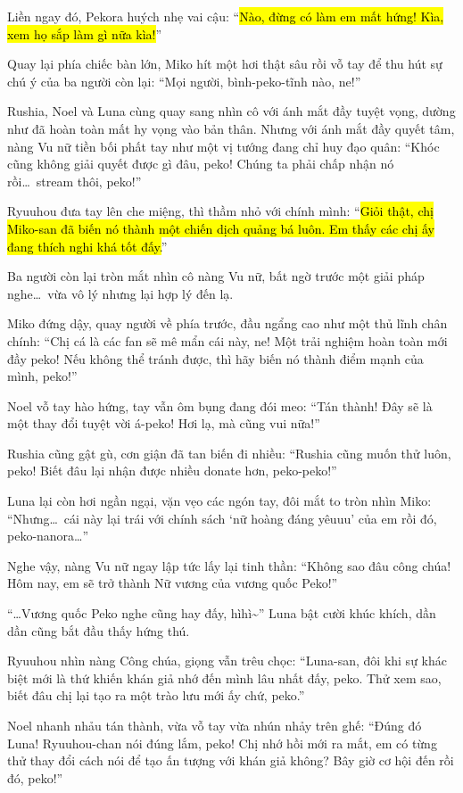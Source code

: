 \documentclass[../main.tex]{subfiles}
\begin{document}
Liền ngay đó, Pekora huých nhẹ vai cậu: ``\hl{Nào, đừng có làm em mất hứng! Kìa, xem họ sắp làm gì nữa kìa!}''

Quay lại phía chiếc bàn lớn, Miko hít một hơi thật sâu rồi vỗ tay để thu hút sự chú ý của ba người còn lại: ``Mọi người, bình-peko-tĩnh nào, ne!''

Rushia, Noel và Luna cùng quay sang nhìn cô với ánh mắt đầy tuyệt vọng, dường như đã hoàn toàn mất hy vọng vào bản thân. Nhưng với ánh mắt đầy quyết tâm, nàng Vu nữ tiền bối phất tay như một vị tướng đang chỉ huy đạo quân: ``Khóc cũng không giải quyết được gì đâu, peko! Chúng ta phải chấp nhận nó rồi\dots\ stream thôi, peko!''

Ryuuhou đưa tay lên che miệng, thì thầm nhỏ với chính mình: ``\hl{Giỏi thật, chị Miko-san đã biến nó thành một chiến dịch quảng bá luôn. Em thấy các chị ấy đang thích nghi khá tốt đấy.}''

Ba người còn lại tròn mắt nhìn cô nàng Vu nữ, bất ngờ trước một giải pháp nghe\dots\ vừa vô lý nhưng lại hợp lý đến lạ.

Miko đứng dậy, quay người về phía trước, đầu ngẩng cao như một thủ lĩnh chân chính: ``Chị cá là các fan sẽ mê mẩn cái này, ne! Một trải nghiệm hoàn toàn mới đầy peko! Nếu không thể tránh được, thì hãy biến nó thành điểm mạnh của mình, peko!''


Noel vỗ tay hào hứng, tay vẫn ôm bụng đang đói meo: ``Tán thành! Đây sẽ là một thay đổi tuyệt vời á-peko! Hơi lạ, mà cũng vui nữa!''

Rushia cũng gật gù, cơn giận đã tan biến đi nhiều: ``Rushia cũng muốn thử luôn, peko! Biết đâu lại nhận được nhiều donate hơn, peko-peko!''

Luna lại còn hơi ngần ngại, vặn vẹo các ngón tay, đôi mắt to tròn nhìn Miko: ``Nhưng\dots\ cái này lại trái với chính sách `nữ hoàng đáng yêuuu' của em rồi đó, peko-nanora\dots''

Nghe vậy, nàng Vu nữ ngay lập tức lấy lại tinh thần: ``Không sao đâu công chúa! Hôm nay, em sẽ trở thành Nữ vương của vương quốc Peko!''

``\dots Vương quốc Peko nghe cũng hay đấy, hìhì\~{}'' Luna bật cười khúc khích, dần dần cũng bắt đầu thấy hứng thú.

Ryuuhou nhìn nàng Công chúa, giọng vẫn trêu chọc: ``Luna-san, đôi khi sự khác biệt mới là thứ khiến khán giả nhớ đến mình lâu nhất đấy, peko. Thử xem sao, biết đâu chị lại tạo ra một trào lưu mới ấy chứ, peko.''

Noel nhanh nhảu tán thành, vừa vỗ tay vừa nhún nhảy trên ghế: ``Đúng đó Luna! Ryuuhou-chan nói đúng lắm, peko! Chị nhớ hồi mới ra mắt, em có từng thử thay đổi cách nói để tạo ấn tượng với khán giả không? Bây giờ cơ hội đến rồi đó, peko!''
\end{document}
